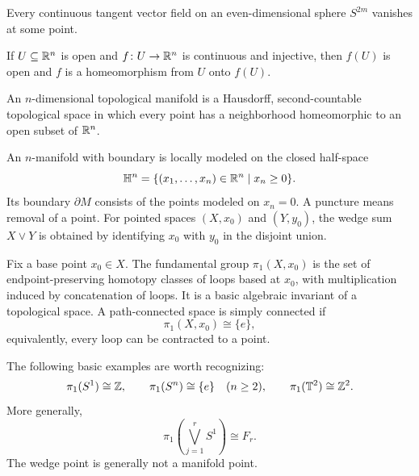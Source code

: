    \begin{theorem}
        Every continuous tangent vector field on an even-dimensional sphere
        $S^{2m}$ vanishes at some point.
    \end{theorem}

    \begin{theorem}
        If $U\subseteq\mathbb{R}^n$ is open and $f\colon U\to\mathbb{R}^n$ is continuous and injective,
        then $f(U)$ is open and $f$ is a homeomorphism from $U$ onto $f(U)$.
    \end{theorem}

    \begin{definition}[Manifold]
        An $n$-dimensional topological manifold is a Hausdorff, second-countable
        topological space in which every point has a neighborhood homeomorphic
        to an open subset of $\mathbb{R}^n$.
    \end{definition}

    \begin{definition}
        An $n$-manifold with boundary is locally modeled on the closed
        half-space
        \[
            \mathbb{H}^n
            =
            \{(x_1,\dots,x_n)\in\mathbb{R}^n\mid x_n\geq0\}.
        \]
        Its boundary $\partial M$ consists of the points modeled on $x_n=0$.
        A puncture means removal of a point. For pointed spaces $(X,x_0)$ and
        $(Y,y_0)$, the wedge sum $X\vee Y$ is obtained by identifying $x_0$
        with $y_0$ in the disjoint union.
    \end{definition}

    \begin{definition}
        Fix a base point $x_0\in X$. The fundamental group
        $\pi_1(X,x_0)$ is the set of endpoint-preserving homotopy classes of
        loops based at $x_0$, with multiplication induced by concatenation of
        loops. It is a basic algebraic invariant of a topological space. A
        path-connected space is simply connected if
        \[
            \pi_1(X,x_0)\cong\{e\},
        \]
        equivalently, every loop can be contracted to a point.
    \end{definition}

    \begin{fact}
        The following basic examples are worth recognizing:
        \[
            \pi_1(S^1)\cong\mathbb{Z},
            \qquad
            \pi_1(S^n)\cong\{e\}\quad(n\geq 2),
            \qquad
            \pi_1(\mathbb{T}^2)\cong\mathbb{Z}^2.
        \]
        More generally,
        \[
            \pi_1\!\left(\bigvee_{j=1}^{r}S^1\right)\cong F_r.
        \]
        The wedge point is generally not a manifold point.
    \end{fact}

